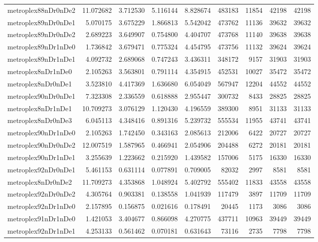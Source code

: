 \documentclass[../../../thesis.tex]{subfiles}
\begin{document}
\begin{longtable}{|l|r|r|r|r|r|r|r|r|}
metroplex88nDr0nDe2 & 11.072682 & 3.712530 & 5.116144 & 8.828674 & 483183 & 11854 & 42198 & 42198 \\
metroplex89nDr0nDe1 & 5.070175 & 3.675229 & 1.866813 & 5.542042 & 473762 & 11136 & 39632 & 39632 \\
metroplex89nDr0nDe2 & 2.689223 & 3.649907 & 0.754800 & 4.404707 & 473768 & 11140 & 39638 & 39638 \\
metroplex89nDr1nDe0 & 1.736842 & 3.679471 & 0.775324 & 4.454795 & 473756 & 11132 & 39624 & 39624 \\
metroplex89nDr1nDe1 & 4.092732 & 2.689068 & 0.747243 & 3.436311 & 348172 & 9157 & 31903 & 31903 \\
metroplex8nDr1nDe0 & 2.105263 & 3.563801 & 0.791114 & 4.354915 & 452531 & 10027 & 35472 & 35472 \\
metroplex8nDr0nDe1 & 3.523810 & 4.417369 & 1.636680 & 6.054049 & 567947 & 12204 & 44552 & 44552 \\
metroplex90nDr0nDe1 & 7.323308 & 2.336559 & 0.618888 & 2.955447 & 300732 & 8433 & 28825 & 28825 \\
metroplex8nDr1nDe1 & 10.709273 & 3.076129 & 1.120430 & 4.196559 & 389300 & 8951 & 31133 & 31133 \\
metroplex8nDr0nDe3 & 6.045113 & 4.348416 & 0.891316 & 5.239732 & 555534 & 11955 & 43741 & 43741 \\
metroplex90nDr1nDe0 & 2.105263 & 1.742450 & 0.343163 & 2.085613 & 212006 & 6422 & 20727 & 20727 \\
metroplex90nDr0nDe2 & 12.007519 & 1.587965 & 0.466941 & 2.054906 & 204488 & 6272 & 20181 & 20181 \\
metroplex90nDr1nDe1 & 3.255639 & 1.223662 & 0.215920 & 1.439582 & 157006 & 5175 & 16330 & 16330 \\
metroplex92nDr0nDe1 & 5.461153 & 0.631114 & 0.077891 & 0.709005 & 82032 & 2997 & 8581 & 8581 \\
metroplex8nDr0nDe2 & 11.709273 & 4.353868 & 1.048924 & 5.402792 & 555402 & 11833 & 43558 & 43558 \\
metroplex92nDr0nDe2 & 4.305764 & 0.903381 & 0.138558 & 1.041939 & 117479 & 3897 & 11709 & 11709 \\
metroplex92nDr1nDe0 & 2.157895 & 0.156875 & 0.021616 & 0.178491 & 20445 & 1173 & 3086 & 3086 \\
metroplex91nDr1nDe0 & 1.421053 & 3.404677 & 0.866098 & 4.270775 & 437711 & 10963 & 39449 & 39449 \\
metroplex92nDr1nDe1 & 4.253133 & 0.561462 & 0.070181 & 0.631643 & 73116 & 2735 & 7798 & 7798 \\

\end{longtable}
\end{document}
